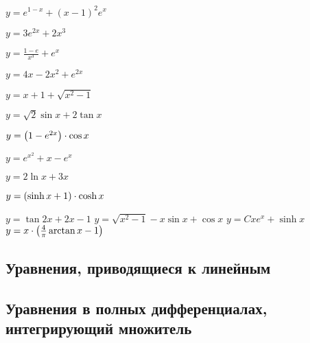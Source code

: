 \begin{enumsols}
		\item \( y = e^{1 - x} + (x - 1)^2 e^{x} \) %
		\item \( y = 3e^{2x} + 2x^3 \) %
		\item \( y = \frac{1 - e}{x^3} + e^{x} \) %
		\item \( y = 4x - 2x^2 + e^{2x} \) %
		\item \( y = x + 1 + \sqrt{x^2 - 1} \) %
		\item \( y = \sqrt{2} \sin{x} + 2 \tan{x} \) %
		\item \( y = \left( 1 - e^{2x} \right) \cdot \cos{x} \) %
		\item \( y = e^{x^2} + x - e^{x} \) %
		\item \( y = 2 \ln{x} + 3x \) %
		\item \( y = \left( \sinh{x} + 1 \right) \cdot \cosh{x} \) %

		\itemstar \( y = \tan{2x} + 2x - 1 \) %
		\itemstar \( y = \sqrt{x^2 - 1} - x \sin{x} + \cos{x} \) %
		\itemstar \( y = C x e^{x} + \sinh{x} \) %
		\itemstar \( y = x \cdot \left( \frac{4}{\pi} \arctan{x} - 1 \right) \) %

	\end{enumsols}

\subsection*{Уравнения, приводящиеся к линейным}

\subsection*{Уравнения в полных дифференциалах, интегрирующий множитель}

